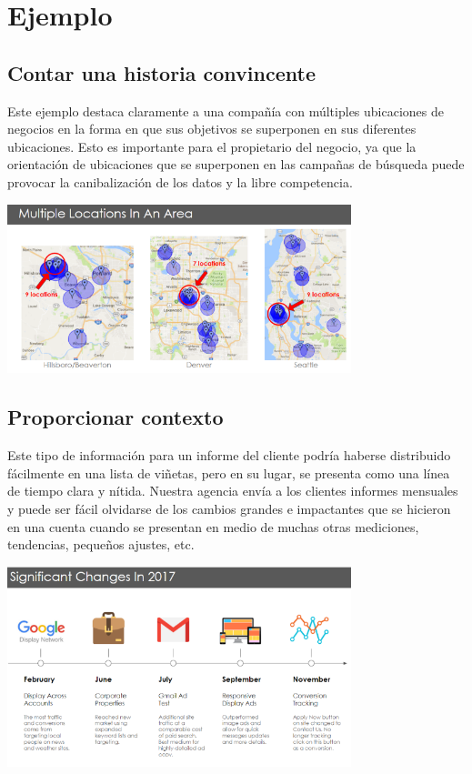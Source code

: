 \documentclass[preprint,12pt]{elsarticle}
\begin{document}

	

\pagebreak
\section{Ejemplo}
	
\subsection{Contar una historia convincente}	
Este ejemplo destaca claramente a una compañía con múltiples ubicaciones de negocios en la forma en que sus objetivos se superponen en sus diferentes ubicaciones. Esto es importante para el propietario del negocio, ya que la orientación de ubicaciones que se superponen en las campañas de búsqueda puede provocar la canibalización de los datos y la libre competencia. 
\begin{center}
	\includegraphics[width=10cm]{./Imagenes/ejemplo1} 
\end{center}

\subsection{Proporcionar contexto}	
Este tipo de información para un informe del cliente podría haberse distribuido fácilmente en una lista de viñetas, pero en su lugar, se presenta como una línea de tiempo clara y nítida. Nuestra agencia envía a los clientes informes mensuales y puede ser fácil olvidarse de los cambios grandes e impactantes que se hicieron en una cuenta cuando se presentan en medio de muchas otras mediciones, tendencias, pequeños ajustes, etc. 
\begin{center}
	\includegraphics[width=10cm]{./Imagenes/ejemplo2} 
\end{center}
\end{document}
